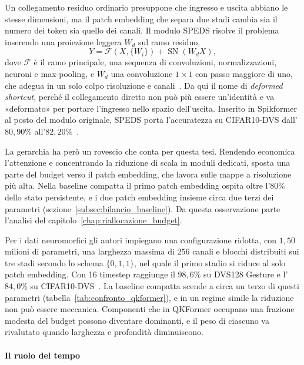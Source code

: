 Un collegamento residuo ordinario presuppone che ingresso e uscita abbiano le stesse dimensioni, ma il patch embedding che separa due stadi cambia sia il numero dei token sia quello dei canali. Il modulo SPEDS risolve il problema inserendo una proiezione leggera $W_d$ sul ramo residuo,
\begin{equation}
\label{eq:speds_formulazione}
Y = \mathcal{F}(X, \{W_i\}) + \operatorname{SN}(W_d X),
\end{equation}
dove $\mathcal{F}$ è il ramo principale, una sequenza di convoluzioni, normalizzazioni, neuroni e max-pooling, e $W_d$ una convoluzione $1\times 1$ con passo maggiore di uno, che adegua in un solo colpo risoluzione e canali~\cite{zhou2024qkformer}. Da qui il nome di \emph{deformed shortcut}, perché il collegamento diretto non può più essere un'identità e va «deformato» per portare l'ingresso nello spazio dell'uscita. Inserito in Spikformer al posto del modulo originale, SPEDS porta l'accuratezza su CIFAR10-DVS dall'$80{,}90\%$ all'$82{,}20\%$~\cite{zhou2024qkformer}.

La gerarchia ha però un rovescio che conta per questa tesi. Rendendo economica l'attenzione e concentrando la riduzione di scala in moduli dedicati, sposta una parte del budget verso il patch embedding, che lavora sulle mappe a risoluzione più alta. Nella baseline compatta il primo patch embedding ospita oltre l'$80\%$ dello stato persistente, e i due patch embedding insieme circa due terzi dei parametri (sezione~\ref{subsec:bilancio_baseline}). Da questa osservazione parte l'analisi del capitolo~\ref{chap:riallocazione_budget}.

Per i dati neuromorfici gli autori impiegano una configurazione ridotta, con $1{,}50$ milioni di parametri, una larghezza massima di 256 canali e blocchi distribuiti sui tre stadi secondo lo schema $\{0,1,1\}$, nel quale il primo stadio si riduce al solo patch embedding. Con 16 timestep raggiunge il $98{,}6\%$ su DVS128 Gesture e l'$84{,}0\%$ su CIFAR10-DVS~\cite{zhou2024qkformer}. La baseline compatta scende a circa un terzo di questi parametri (tabella~\ref{tab:confronto_qkformer}), e in un regime simile la riduzione non può essere meccanica. Componenti che in QKFormer occupano una frazione modesta del budget possono diventare dominanti, e il peso di ciascuno va rivalutato quando larghezza e profondità diminuiscono.

\paragraph{Il ruolo del tempo}
\label{subsec:qkformer_tempo}


